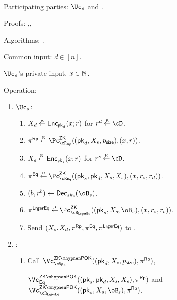 \begin{protocol}~\label{prot:ConfidentialTransactions:Transfer}
	\item[Participating parties:] $\Uc_s$ and \Cc.
	
\item[Proofs:]   \piZK{\rRp},\pZK{\rEq},\pZK{\rLrgEq}


\item[Algorithms:]    \Dec.

	
	\item[Common input:] $d\in [n]$.
	
	\item[$\Uc_s$'s private  input.] $x \in {\mathbb{N}}$.
	
\item[Operation:] ~
	
	\begin{enumerate}
		\item  $\Uc_s$: 
		
		\begin{enumerate}
			\item $X_d \mathbin{\stackrel{\mbox{\tiny R}}{\leftarrow}} \mathsf{Enc}_{{\mathsf{pk}}_d}(x;r)$ for $r^d \getsr \cD$.
			
		
			\item $\pi^\RPs \getsr \pZK{\rRp}((\pk_d,X_s,\psize),(x,r))$.
			
			
			\item $X_s \mathbin{\stackrel{\mbox{\tiny R}}{\leftarrow}} \mathsf{Enc}_{{\mathsf{pk}}_s}(x;r)$ for $r^s \getsr \cD$.
			
			
			
			\item $\pi^\Eqs \getsr \pZK{\rEq}((\pk_s,\pk_d,X_s,X_s),(x,r_s,r_d))$.
			
			
			\item $(b,r^b) \asn \Dec_{sk_s}(\oB_s)$.
			
			
			\item $\pi^\LrgEqs \getsr \pZK{\rLrgEq}((\pk_s,X_s,\oB_s),(x,r_s,r_b))$.
			
			
			\item Send $(X_s,X_d,\pi^{\sf Rp},\pi^{\sf Eq},\pi^{\sf LrgerEq})$ to \Cc.
		\end{enumerate}
		
		
		\item  \Cc: 
		
		\begin{enumerate}
			\item  Call $\vZKPOK{\rRp}((\pk_d,X_s,\psize),\pi^\RPs)$,
			
			 $\vZKPOK{\Eqs}((\pk_s,\pk_d,X_s,X_s),\pi^\RPs)$ and $\vZKPOK{\rLrgEq}((\pk_s,X_s,\oB_s),\pi^\RPs)$.
			

\end{enumerate}
\end{enumerate}
\end{protocol}
